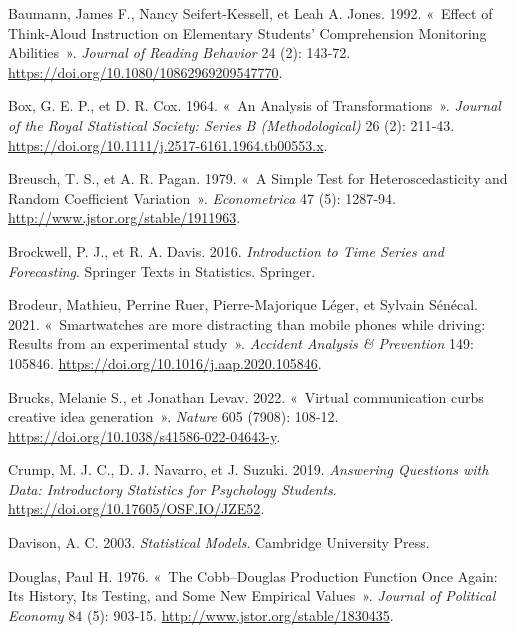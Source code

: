 \documentclass[
  11pt,
  letterpaper,
]{scrbook}
\newlength{\cslhangindent}
\newenvironment{CSLReferences}[2] %
 {\begin{list}{}{%
  \setlength{\itemindent}{0pt}
  \setlength{\leftmargin}{0pt}
  \setlength{\parsep}{0pt}
  \ifodd #1
   \setlength{\leftmargin}{\cslhangindent}
   \setlength{\itemindent}{-1\cslhangindent}
  \fi
  \setlength{\itemsep}{#2\baselineskip}}}
 {\end{list}}
\theoremstyle{plain}
\theoremstyle{plain}
\theoremstyle{definition}
\theoremstyle{definition}
\theoremstyle{remark}
\begin{document}

\label{refs}
\begin{CSLReferences}{1}{0}
Baumann, James F., Nancy Seifert-Kessell, et Leah A. Jones. 1992.
{«~Effect of Think-Aloud Instruction on Elementary Students'
Comprehension Monitoring Abilities~»}. \emph{Journal of Reading
Behavior} 24 (2): 143‑72.
\url{https://doi.org/10.1080/10862969209547770}.

Box, G. E. P., et D. R. Cox. 1964. {«~An Analysis of Transformations~»}.
\emph{Journal of the Royal Statistical Society: Series B
(Methodological)} 26 (2): 211‑43.
\url{https://doi.org/10.1111/j.2517-6161.1964.tb00553.x}.

Breusch, T. S., et A. R. Pagan. 1979. {«~A Simple Test for
Heteroscedasticity and Random Coefficient Variation~»}.
\emph{Econometrica} 47 (5): 1287‑94.
\url{http://www.jstor.org/stable/1911963}.

Brockwell, P. J., et R. A. Davis. 2016. \emph{Introduction to Time
Series and Forecasting}. Springer Texts in Statistics. Springer.

Brodeur, Mathieu, Perrine Ruer, Pierre-Majorique Léger, et Sylvain
Sénécal. 2021. {«~Smartwatches are more distracting than mobile phones
while driving: Results from an experimental study~»}. \emph{Accident
Analysis \& Prevention} 149: 105846.
\url{https://doi.org/10.1016/j.aap.2020.105846}.

Brucks, Melanie S., et Jonathan Levav. 2022. {«~Virtual communication
curbs creative idea generation~»}. \emph{Nature} 605 (7908): 108‑12.
\url{https://doi.org/10.1038/s41586-022-04643-y}.

Crump, M. J. C., D. J. Navarro, et J. Suzuki. 2019. \emph{Answering
Questions with Data: Introductory Statistics for Psychology Students}.
\url{https://doi.org/10.17605/OSF.IO/JZE52}.

Davison, A. C. 2003. \emph{Statistical Models}. Cambridge University
Press.

Douglas, Paul H. 1976. {«~The {Cobb--Douglas} Production Function Once
Again: Its History, Its Testing, and Some New Empirical Values~»}.
\emph{Journal of Political Economy} 84 (5): 903‑15.
\url{http://www.jstor.org/stable/1830435}.


\end{CSLReferences}
\end{document}
